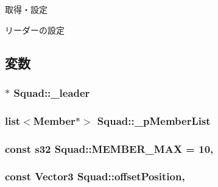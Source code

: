 取得・設定 

リーダーの設定 

\subsection{変数}
\hypertarget{class_squad_a8b59302b991f8a7378997a8b94ff49cb}{
\subsubsection[{\-\_\-leader}]{$\ast$ Squad\-::\-\_\-leader\hspace{0.3cm}{\ttfamily [protected]}}}\label{class_squad_a8b59302b991f8a7378997a8b94ff49cb}
\hypertarget{class_squad_aa95fcbc892273659b1e342e6dd522573}{
\subsubsection[{\-\_\-p\-Member\-List}]{\setlength{\rightskip}{0pt plus 5cm}list$<${\bf Member}$\ast$$>$ Squad\-::\-\_\-p\-Member\-List\hspace{0.3cm}{\ttfamily [protected]}}}\label{class_squad_aa95fcbc892273659b1e342e6dd522573}
\hypertarget{class_squad_a9cdd878b045c7242f54a169d02dc5e18}{
\subsubsection[{M\-E\-M\-B\-E\-R\-\_\-\-M\-A\-X}]{\setlength{\rightskip}{0pt plus 5cm}const {\bf s32} Squad\-::\-M\-E\-M\-B\-E\-R\-\_\-\-M\-A\-X = 10\hspace{0.3cm}{\ttfamily [static]}, {\ttfamily [protected]}}}\label{class_squad_a9cdd878b045c7242f54a169d02dc5e18}
\hypertarget{class_squad_a961d7d3aaf28d3d6174f220c8c298718}{
\subsubsection[{offset\-Position}]{\setlength{\rightskip}{0pt plus 5cm}const {\bf Vector3} Squad\-::offset\-Position\hspace{0.3cm}{\ttfamily [static]}, {\ttfamily [protected]}}}\label{class_squad_a961d7d3aaf28d3d6174f220c8c298718}
